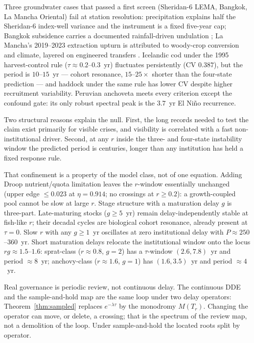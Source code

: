 \documentclass[11pt]{article}
\theoremstyle{definition}
\begin{document}
Three groundwater cases that passed a first screen (Sheridan-6 LEMA, Bangkok, La Mancha Oriental) fail at station resolution: precipitation explains half the Sheridan-6 index-well variance and the instrument is a fixed five-year cap; Bangkok subsidence carries a documented rainfall-driven undulation \cite{ahmed2024}; La Mancha's 2019--2023 extraction upturn is attributed to woody-crop conversion and climate, layered on engineered transfers \cite{hoogesteger2025}. Icelandic cod under the 1995 harvest-control rule ($\tau\approx 0.2$--$0.3$~yr) fluctuates persistently (CV $0.387$), but the period is $10$--$15$~yr --- cohort resonance, $15$--$25\times$ shorter than the four-state prediction --- and haddock under the same rule has lower CV despite higher recruitment variability. Peruvian anchoveta meets every criterion except the confound gate: its only robust spectral peak is the $3.7$~yr El Ni\~no recurrence.

Two structural reasons explain the null. First, the long records needed to test the claim exist primarily for visible crises, and visibility is correlated with a fast non-institutional driver. Second, at any $r$ inside the three- and four-state instability window the predicted period is centuries, longer than any institution has held a fixed response rule.

That confinement is a property of the model class, not of one equation. Adding Droop nutrient/quota limitation leaves the $r$-window essentially unchanged (upper edge $\le 0.023$ at $\eta=0.914$; no crossings at $r\ge 0.2$): a growth-coupled pool cannot be slow at large $r$. Stage structure with a maturation delay $g$ is three-part. Late-maturing stocks ($g\ge 5$~yr) remain delay-independently stable at fish-like $r$; their decadal cycles are biological cohort resonance, already present at $\tau=0$. Slow $r$ with any $g\ge 1$~yr oscillates at zero institutional delay with $P\approx 250$--$360$~yr. Short maturation delays relocate the institutional window onto the locus $rg\approx 1.5$--$1.6$: sprat-class ($r\approx 0.8$, $g=2$) has a $\tau$-window $(2.6,7.8)$~yr and period $\approx 8$~yr; anchovy-class ($r\approx 1.6$, $g=1$) has $(1.6,3.5)$~yr and period $\approx 4$~yr.

Real governance is periodic review, not continuous delay. The continuous DDE and the sample-and-hold map are the same loop under two delay operators: Theorem~\ref{thm:sampled} replaces $e^{-\lambda\tau}$ by the monodromy $M(T_r)$. Changing the operator can move, or delete, a crossing; that is the spectrum of the review map, not a demolition of the loop. Under sample-and-hold the located roots split by operator.
\end{document}
